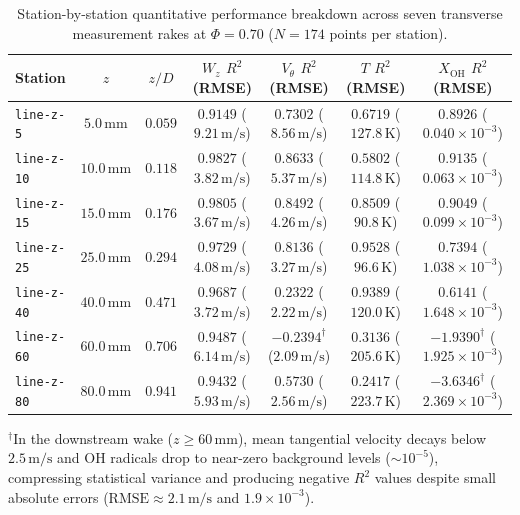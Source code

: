 \documentclass[reprint,aps,prfluids,superscriptaddress,twocolumn,floatfix]{revtex4-2}
\begin{document}
\begin{table}[t]
\centering
\caption{Station-by-station quantitative performance breakdown across seven transverse measurement rakes at $\Phi = 0.70$ ($N = 174$ points per station).}
\label{tab:station_breakdown}
\small
\begin{tabular*}{\textwidth}{@{\extracolsep{\fill}}lcccccc}
\toprule
Station & $z$ & $z/D$ & $W_z$ $R^2$ (RMSE) & $V_\theta$ $R^2$ (RMSE) & $T$ $R^2$ (RMSE) & $X_{\text{OH}}$ $R^2$ (RMSE) \\
\midrule
\texttt{line-z-5} & $5.0\,\text{mm}$ & $0.059$ & $0.9149$ ($9.21\,\text{m/s}$) & $0.7302$ ($8.56\,\text{m/s}$) & $0.6719$ ($127.8\,\text{K}$) & $0.8926$ ($0.040 \times 10^{-3}$) \\
\texttt{line-z-10} & $10.0\,\text{mm}$ & $0.118$ & $0.9827$ ($3.82\,\text{m/s}$) & $0.8633$ ($5.37\,\text{m/s}$) & $0.5802$ ($114.8\,\text{K}$) & $0.9135$ ($0.063 \times 10^{-3}$) \\
\texttt{line-z-15} & $15.0\,\text{mm}$ & $0.176$ & $0.9805$ ($3.67\,\text{m/s}$) & $0.8492$ ($4.26\,\text{m/s}$) & $0.8509$ ($90.8\,\text{K}$) & $0.9049$ ($0.099 \times 10^{-3}$) \\
\texttt{line-z-25} & $25.0\,\text{mm}$ & $0.294$ & $0.9729$ ($4.08\,\text{m/s}$) & $0.8136$ ($3.27\,\text{m/s}$) & $0.9528$ ($96.6\,\text{K}$) & $0.7394$ ($1.038 \times 10^{-3}$) \\
\texttt{line-z-40} & $40.0\,\text{mm}$ & $0.471$ & $0.9687$ ($3.72\,\text{m/s}$) & $0.2322$ ($2.22\,\text{m/s}$) & $0.9389$ ($120.0\,\text{K}$) & $0.6141$ ($1.648 \times 10^{-3}$) \\
\texttt{line-z-60} & $60.0\,\text{mm}$ & $0.706$ & $0.9487$ ($6.14\,\text{m/s}$) & $-0.2394^\dagger$ ($2.09\,\text{m/s}$) & $0.3136$ ($205.6\,\text{K}$) & $-1.9390^\dagger$ ($1.925 \times 10^{-3}$) \\
\texttt{line-z-80} & $80.0\,\text{mm}$ & $0.941$ & $0.9432$ ($5.93\,\text{m/s}$) & $0.5730$ ($2.56\,\text{m/s}$) & $0.2417$ ($223.7\,\text{K}$) & $-3.6346^\dagger$ ($2.369 \times 10^{-3}$) \\
\bottomrule
\end{tabular*}
\begin{flushleft}
\footnotesize
$^\dagger$In the downstream wake ($z \ge 60\,\text{mm}$), mean tangential velocity decays below $2.5\,\text{m/s}$ and OH radicals drop to near-zero background levels ($\sim 10^{-5}$), compressing statistical variance and producing negative $R^2$ values despite small absolute errors ($\text{RMSE} \approx 2.1\,\text{m/s}$ and $1.9 \times 10^{-3}$).
\end{flushleft}
\end{table}
\end{document}
